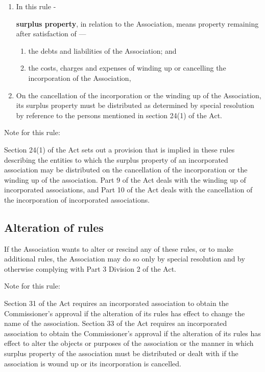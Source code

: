 \documentclass[../constitution.tex]{subfiles}
\begin{document}
\begin{enumerate}

\item In this rule -

\textbf{surplus property}, in relation to the Association, means property remaining after satisfaction of ---

  \begin{enumerate}
  \item the debts and liabilities of the Association; and
  \item the costs, charges and expenses of winding up or cancelling the incorporation of the Association, 
  \end{enumerate}
\item On the cancellation of the incorporation or the winding up of the Association, its surplus property must be distributed as determined by special resolution by reference to the persons mentioned in section 24(1) of the Act.
\end{enumerate}


Note for this rule: 

Section 24(1) of the Act sets out a provision that is implied in these rules describing the entities to which the surplus property of an incorporated association may be distributed on the cancellation of the incorporation or the winding up of the association.  Part 9 of the Act deals with the winding up of incorporated associations, and Part 10 of the Act deals with the cancellation of the incorporation of incorporated associations. 

\hypertarget{alteration-of-rules}{%
\subsection{Alteration of rules}\label{alteration-of-rules}}

If the Association wants to alter or rescind any of these rules, or to make additional rules, the Association may do so only by special resolution and by otherwise complying with Part 3 Division 2 of the Act.


Note for this rule:

Section 31 of the Act requires an incorporated association to obtain the Commissioner's approval if the alteration of its rules has effect to change the name of the association.  Section 33 of the Act requires an incorporated association to obtain the Commissioner's approval if the alteration of its rules has effect to alter the objects or purposes of the association or the manner in which surplus property of the association must be distributed or dealt with if the association is wound up or its incorporation is cancelled. 
\end{document}
